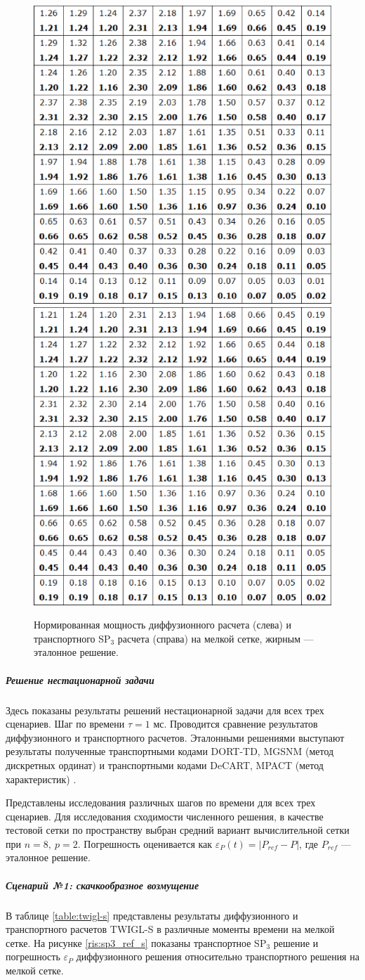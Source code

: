 \documentclass{crm-article}
\begin{document}
\begin{figure}[ht]
\begin{center}
	\includegraphics[width=0.4\linewidth]{dif_pwr.eps} \hspace{20pt}
	\includegraphics[width=0.4\linewidth]{sp3_pwr.eps}\\
	\caption{\label{image:canonsummary} Нормированная мощность диффузионного расчета (слева) и транспортного SP$_3$ расчета (справа) на мелкой сетке, жирным --- эталонное решение.}
	\label{ris:int_pwr}
\end{center}
\end{figure}

\subparagraph{Решение нестационарной задачи}
Здесь показаны результаты решений нестационарной задачи для всех трех сценариев.
Шаг по времени $\tau=1$ мс.
Проводится сравнение результатов диффузионного и транспортного расчетов.
Эталонными решениями выступают результаты полученные транспортными кодами DORT-TD, MGSNM (метод дискретных ординат) и транспортными кодами DeCART, MPACT (метод характеристик) \cite{kondrushin2014}.

Представлены исследования различных шагов по времени для всех трех сценариев.  
Для исследования сходимости численного решения, в качестве тестовой сетки  по пространству выбран средний вариант вычислительной сетки при $n=8,\ p=2$.
Погрешность оценивается как $\varepsilon_P(t) = | P_{ref} - P |$, где $P_{ref}$ --- эталонное решение.

\subparagraph{Сценарий №1: скачкообразное возмущение}
В таблице \ref{table:twigl-s} представлены результаты диффузионного и транспортного расчетов TWIGL-S в различные моменты времени на мелкой сетке.
На рисунке \ref{ris:sp3_ref_s} показаны транспортное SP$_3$ решение и погрешность $\varepsilon_P$ диффузионного решения относительно транспортного решения на мелкой сетке. 
\end{document}
